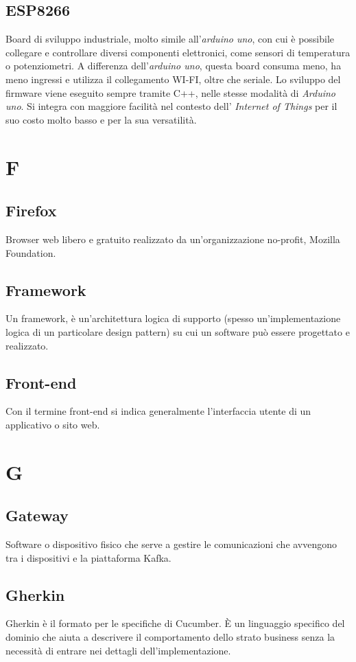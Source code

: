\subsection{ESP8266}  Board di sviluppo industriale, molto simile all'\textit{arduino uno}, con cui è possibile collegare e controllare diversi componenti elettronici, come sensori di temperatura o potenziometri. A differenza dell'\textit{arduino uno}, questa board consuma meno, ha meno ingressi e utilizza il collegamento WI-FI, oltre che seriale. Lo sviluppo del firmware viene eseguito sempre tramite C++, nelle stesse modalità di \textit{Arduino uno}. Si integra con maggiore facilità nel contesto dell' \textit{Internet of Things} per il suo costo molto basso e per la sua versatilità.


\newpage \section{F} %
\subsection{Firefox}  Browser web libero e gratuito realizzato da un'organizzazione no-profit, Mozilla Foundation.
\subsection{Framework}  Un framework, è un'architettura logica di supporto (spesso un'implementazione logica di un particolare design pattern) su cui un software può essere progettato e realizzato.
\subsection{Front-end}  Con il termine front-end si indica generalmente l'interfaccia utente di un applicativo o sito web.

\newpage \section{G}
\subsection{Gateway}  Software o dispositivo fisico che serve a gestire le comunicazioni che avvengono tra i dispositivi e la piattaforma Kafka.
\subsection{Gherkin}  Gherkin è il formato per le specifiche di Cucumber. È un linguaggio specifico del dominio che aiuta a descrivere il comportamento dello strato business senza la necessità di entrare nei dettagli dell'implementazione.

